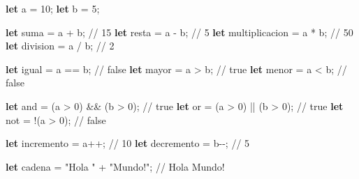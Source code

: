 \documentclass[
  a4paper,
  DIV=11,
  numbers=noendperiod,
  onepage,
  openany]{scrreprt}
\newenvironment{Shaded}{\begin{snugshade}}{\end{snugshade}}
\newcommand{\CommentTok}[1]{\textcolor[rgb]{0.37,0.37,0.37}{#1}}
\newcommand{\DecValTok}[1]{\textcolor[rgb]{0.68,0.00,0.00}{#1}}
\newcommand{\KeywordTok}[1]{\textcolor[rgb]{0.00,0.23,0.31}{\textbf{#1}}}
\newcommand{\NormalTok}[1]{\textcolor[rgb]{0.00,0.23,0.31}{#1}}
\newcommand{\OperatorTok}[1]{\textcolor[rgb]{0.37,0.37,0.37}{#1}}
\newcommand{\StringTok}[1]{\textcolor[rgb]{0.13,0.47,0.30}{#1}}
\begin{document}
\begin{tcolorbox}
\begin{Shaded}
\begin{Highlighting}[]
\KeywordTok{let}\NormalTok{ a }\OperatorTok{=} \DecValTok{10}\OperatorTok{;}
\KeywordTok{let}\NormalTok{ b }\OperatorTok{=} \DecValTok{5}\OperatorTok{;}

\KeywordTok{let}\NormalTok{ suma }\OperatorTok{=}\NormalTok{ a }\OperatorTok{+}\NormalTok{ b}\OperatorTok{;} \CommentTok{// 15}
\KeywordTok{let}\NormalTok{ resta }\OperatorTok{=}\NormalTok{ a }\OperatorTok{{-}}\NormalTok{ b}\OperatorTok{;} \CommentTok{// 5}
\KeywordTok{let}\NormalTok{ multiplicacion }\OperatorTok{=}\NormalTok{ a }\OperatorTok{*}\NormalTok{ b}\OperatorTok{;} \CommentTok{// 50}
\KeywordTok{let}\NormalTok{ division }\OperatorTok{=}\NormalTok{ a }\OperatorTok{/}\NormalTok{ b}\OperatorTok{;} \CommentTok{// 2}

\KeywordTok{let}\NormalTok{ igual }\OperatorTok{=}\NormalTok{ a }\OperatorTok{==}\NormalTok{ b}\OperatorTok{;} \CommentTok{// false}
\KeywordTok{let}\NormalTok{ mayor }\OperatorTok{=}\NormalTok{ a }\OperatorTok{\textgreater{}}\NormalTok{ b}\OperatorTok{;} \CommentTok{// true}
\KeywordTok{let}\NormalTok{ menor }\OperatorTok{=}\NormalTok{ a }\OperatorTok{\textless{}}\NormalTok{ b}\OperatorTok{;} \CommentTok{// false}

\KeywordTok{let}\NormalTok{ and }\OperatorTok{=}\NormalTok{ (a }\OperatorTok{\textgreater{}} \DecValTok{0}\NormalTok{) }\OperatorTok{\&\&}\NormalTok{ (b }\OperatorTok{\textgreater{}} \DecValTok{0}\NormalTok{)}\OperatorTok{;} \CommentTok{// true}
\KeywordTok{let}\NormalTok{ or }\OperatorTok{=}\NormalTok{ (a }\OperatorTok{\textgreater{}} \DecValTok{0}\NormalTok{) }\OperatorTok{||}\NormalTok{ (b }\OperatorTok{\textgreater{}} \DecValTok{0}\NormalTok{)}\OperatorTok{;} \CommentTok{// true}
\KeywordTok{let}\NormalTok{ not }\OperatorTok{=} \OperatorTok{!}\NormalTok{(a }\OperatorTok{\textgreater{}} \DecValTok{0}\NormalTok{)}\OperatorTok{;} \CommentTok{// false}

\KeywordTok{let}\NormalTok{ incremento }\OperatorTok{=}\NormalTok{ a}\OperatorTok{++;} \CommentTok{// 10}
\KeywordTok{let}\NormalTok{ decremento }\OperatorTok{=}\NormalTok{ b}\OperatorTok{{-}{-};} \CommentTok{// 5}

\KeywordTok{let}\NormalTok{ cadena }\OperatorTok{=} \StringTok{"Hola "} \OperatorTok{+} \StringTok{"Mundo!"}\OperatorTok{;} \CommentTok{// Hola Mundo!}
\end{Highlighting}
\end{Shaded}


\end{tcolorbox}
\end{document}
